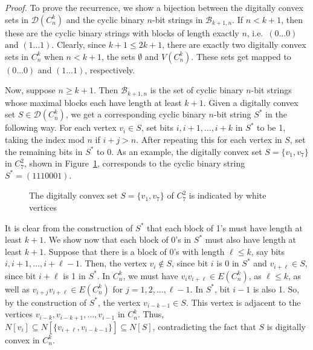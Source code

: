 \documentclass[12pt]{article}
\begin{document}
\noindent
\emph{Proof.} To prove the recurrence, we show a bijection between the digitally convex sets in $\mathscr{D}(C^k_n)$ and the cyclic binary $n$-bit strings in $\mathscr{B}_{k+1,n}$. If $n< k+1$, then these are the cyclic binary strings with blocks of length exactly $n$, i.e.~$(0\dots0)$ and $(1\dots1)$. Clearly, since $k+1\leq 2k+1$, there are exactly two digitally convex sets in $C^k_{n}$ when $n < k+1$, the sets $\emptyset$ and $V(C^k_n)$. These sets get mapped to $(0\dots0)$ and $(1\dots1)$, respectively. 

Now, suppose $n\geq k+1$. Then $\mathscr{B}_{k+1,n}$ is the set of cyclic binary $n$-bit strings whose maximal blocks each have length at least $k+1$. Given a digitally convex set $S\in\mathscr{D}(C^k_n)$, we get a corresponding cyclic binary $n$-bit string $S^*$ in the following way. For each vertex $v_i\in S$, set bits $i, i+1, \dots, i+k$ in $S^*$ to be 1, taking the index mod $n$ if $i+j>n$. After repeating this for each vertex in $S$, set the remaining bits in $S^*$ to 0. As an example, the digitally convex set $S=\{v_1,v_7\}$ in $C^2_7$, shown in Figure~\ref{fig:c27}, corresponds to the cyclic binary string $S^*=(1110001)$. 

\begin{figure}[ht]
\centering 
{}
\caption{The digitally convex set $S=\{v_1, v_7\}$ of $C^2_7$ is indicated by white vertices}
\label{fig:c27}
\end{figure}

It is clear from the construction of $S^*$ that each block of 1's must have length at least $k+1$. We show now that each block of 0's in $S^*$ must also have length at least $k+1$. Suppose that there is a block of 0's with length $\ell\leq k$, say bits $i, i+1, \dots, i+\ell-1$. Then, the vertex $v_i\not\in S$, since bit $i$ is 0 in $S^*$ and $v_{i+\ell}\in S$, since bit $i+\ell$ is 1 in $S^*$. In $C^k_n$, we must have $v_i v_{i+\ell}\in E(C^k_n)$, as $\ell \leq k$, as well as $v_{i+j}v_{i+\ell}\in E(C^k_n)$ for $j=1,2,\dots,\ell-1$.   In $S^*$, bit $i-1$ is also 1. So, by the construction of $S^*$, the vertex $v_{i-k-1}\in S$. This vertex is adjacent to the vertices $v_{i-k}, v_{i-k+1}, \dots,v_{i-1}$ in $C^k_n$. Thus, $N[v_{i}] \subseteq N[\{v_{i+\ell}, v_{i-k-1}\}] \subseteq N[S]$, contradicting the fact that $S$ is digitally convex in $C^k_n$. 
\end{document}
